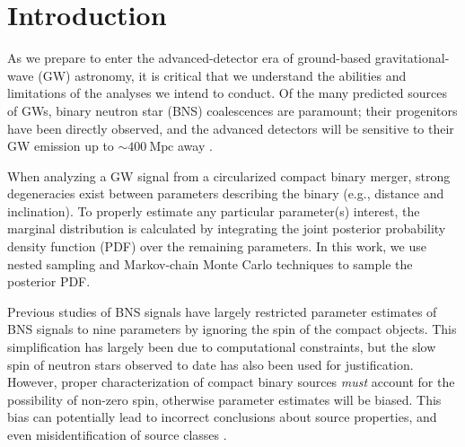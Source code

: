 \section{Introduction}

As we prepare to enter the advanced-detector era of ground-based gravitational-wave (GW) astronomy, it is critical that we understand the abilities and limitations of the analyses we intend to conduct. Of the many predicted sources of GWs, binary neutron star (BNS) coalescences are paramount; their progenitors have been directly observed, and the advanced detectors will be sensitive to their GW emission up to $\sim 400~\mathrm{Mpc}$ away \citep{2013arXiv1304.0670L}.

When analyzing a GW signal from a circularized compact binary merger, strong degeneracies exist between parameters describing the binary (e.g., distance and inclination). To properly estimate any particular parameter(s) interest, the marginal distribution is calculated by integrating the joint posterior probability density function (PDF) over the remaining parameters. In this work, we use nested sampling \citep{Veitch_2010} and Markov-chain Monte Carlo \citep{Christensen_2003,R_ver_2006,van_der_Sluys_2008} techniques to sample the posterior PDF.

Previous studies of BNS signals have largely restricted parameter estimates of BNS signals to nine parameters by ignoring the spin of the compact objects. This simplification has largely been due to computational constraints, but the slow spin of neutron stars observed to date \citep[e.g.,][]{Mandel_2010} has also been used for justification. However, proper characterization of compact binary sources \emph{must} account for the possibility of non-zero spin, otherwise parameter estimates will be biased.  This bias can potentially lead to incorrect conclusions about source properties, and even misidentification of source classes \citep{Buonanno_2009,Berry_2014}.

